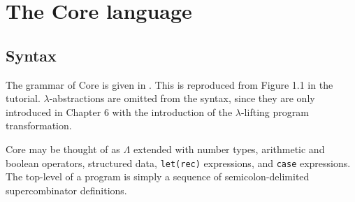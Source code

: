 \section{The Core language}
\label{sec:core}

\subsection{Syntax}
\label{sec:syntax}

The grammar of Core is given in . This is reproduced from Figure 1.1 in the tutorial. $\lambda$-abstractions are omitted from the syntax, since they are only introduced in Chapter 6 with the introduction of the $\lambda$-lifting program transformation.

Core may be thought of as $\Lambda$ extended with number types, arithmetic and boolean operators, structured data, \texttt{let(rec)} expressions, and \texttt{case} expressions. The top-level of a program is simply a sequence of semicolon-delimited supercombinator definitions.

